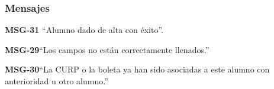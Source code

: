 \subsubsection{Mensajes}

\begin{Citemize}
    \item {\bf MSG-31} ``Alumno dado de alta con éxito''.
    \item {\bf MSG-29}{``Los campos no están correctamente llenados.''}
    \item {\bf MSG-30}{``La CURP o la boleta ya han sido asociadas a este alumno con anterioridad u otro alumno.''}
\end{Citemize}
